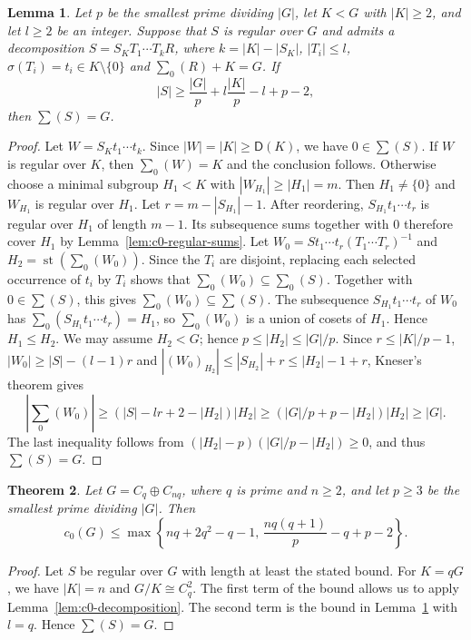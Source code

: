 \documentclass[10pt,a4paper]{amsart}
\newtheorem{thm}{Theorem} [section]
\newtheorem{lem}[thm]{Lemma}
\theoremstyle{definition}
\theoremstyle{remark}
\numberwithin{equation}{section}
\DeclareMathOperator{\st}{st}
\begin{document}
\begin{lem}\label{lem:c0-KneserW0}
Let $p$ be the smallest prime dividing $|G|$, let $K<G$ with $|K|\ge2$, and let $l\ge2$ be an integer.
Suppose that $S$ is regular over $G$ and admits a decomposition
$S=S_KT_1\cdots T_kR$, where $k=|K|-|S_K|$,
$|T_i|\le l$, $\sigma(T_i)=t_i\in K\setminus\{0\}$ and $\sum_0(R)+K=G$.
If
\[
|S|\ge\frac{|G|}{p}+l\frac{|K|}{p}-l+p-2,
\]
then $\sum(S)=G$.
\end{lem}

\begin{proof}
Let $W=S_Kt_1\cdots t_k$. Since $|W|=|K|\ge \mathsf D(K)$, we have $0\in\sum(S)$.
If $W$ is regular over $K$, then $\sum_0(W)=K$ and the conclusion follows.
Otherwise choose a minimal subgroup $H_1<K$ with $|W_{H_1}|\ge|H_1|=m$.
Then $H_1\ne\{0\}$ and $W_{H_1}$ is regular over $H_1$.
Let $r=m-|S_{H_1}|-1$.
After reordering, $S_{H_1}t_1\cdots t_r$ is regular over $H_1$ of length $m-1$.
Its subsequence sums together with $0$ therefore cover $H_1$ by Lemma~\ref{lem:c0-regular-sums}.
Let $W_0=St_1\cdots t_r(T_1\cdots T_r)^{-1}$ and $H_2=\st(\sum_0(W_0))$.
Since the $T_i$ are disjoint, replacing each selected occurrence of
$t_i$ by $T_i$ shows that $\sum_0(W_0)\subseteq\sum_0(S)$.
Together with $0\in\sum(S)$, this gives $\sum_0(W_0)\subseteq\sum(S)$.
The subsequence $S_{H_1}t_1\cdots t_r$ of $W_0$ has
$\sum_0(S_{H_1}t_1\cdots t_r)=H_1$, so $\sum_0(W_0)$ is a union
of cosets of $H_1$. Hence $H_1\le H_2$.
We may assume $H_2<G$; hence $p\le|H_2|\le|G|/p$.
Since $r\le|K|/p-1$, $|W_0|\ge|S|-(l-1) r$ and
$|(W_0)_{H_2}|\le|S_{H_2}|+r\le|H_2|-1+r$, Kneser's theorem gives
\[
|\sum_0(W_0)|\ge(|S|-lr+2-|H_2|)|H_2|
\ge(|G|/p+p-|H_2|)|H_2|\ge|G|.
\]
The last inequality follows from $(|H_2|-p)(|G|/p-|H_2|)\ge0$, and thus $\sum(S)=G$.
\end{proof}



\begin{thm}\label{thm:unified-c0}
Let $G=C_q\oplus C_{nq}$, where $q$ is prime and $n\ge2$,
and let $p\ge3$ be the smallest prime dividing $|G|$. Then
\[
c_0(G)\le
\max\left\{nq+2q^2-q-1,\,
\frac{nq(q+1)}p-q+p-2\right\}.
\]
\end{thm}



\begin{proof}
Let $S$ be regular over $G$ with length at least the stated bound.
For $K=qG$, we have $|K|=n$ and $G/K\cong C_q^2$.
The first term of the bound allows us to apply Lemma~\ref{lem:c0-decomposition}.
The second term is the bound in Lemma~\ref{lem:c0-KneserW0} with $l=q$.
Hence $\sum(S)=G$.
\end{proof}
\end{document}
